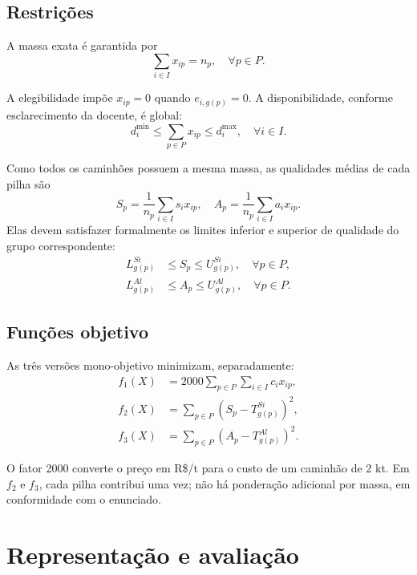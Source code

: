 \documentclass[10pt,twocolumn,a4paper]{article}
\begin{document}
\subsection{Restrições}

A massa exata é garantida por
\begin{equation}
\sum_{i \in I} x_{ip} = n_p, \quad \forall p \in P.
\end{equation}

A elegibilidade impõe $x_{ip} = 0$ quando $e_{i,g(p)} = 0$. A disponibilidade, conforme esclarecimento da docente, é global:
\begin{equation}
d_i^{\min} \le \sum_{p \in P} x_{ip} \le d_i^{\max}, \quad \forall i \in I.
\end{equation}

Como todos os caminhões possuem a mesma massa, as qualidades médias de cada pilha são
\begin{equation}
S_p = \frac{1}{n_p} \sum_{i \in I} s_i x_{ip}, \quad A_p = \frac{1}{n_p} \sum_{i \in I} a_i x_{ip}.
\end{equation}
Elas devem satisfazer formalmente os limites inferior e superior de qualidade do grupo correspondente:
\begin{align}
L_{g(p)}^{Si} &\le S_p \le U_{g(p)}^{Si}, \quad \forall p \in P, \\
L_{g(p)}^{Al} &\le A_p \le U_{g(p)}^{Al}, \quad \forall p \in P.
\end{align}

\subsection{Funções objetivo}

As três versões mono-objetivo minimizam, separadamente:
\begin{align}
f_1(X) &= 2000 \sum_{p \in P} \sum_{i \in I} c_i x_{ip}, \\
f_2(X) &= \sum_{p \in P} \left( S_p - T_{g(p)}^{Si} \right)^2, \\
f_3(X) &= \sum_{p \in P} \left( A_p - T_{g(p)}^{Al} \right)^2.
\end{align}

O fator 2000 converte o preço em R\$/t para o custo de um caminhão de 2 kt. Em $f_2$ e $f_3$, cada pilha contribui uma vez; não há ponderação adicional por massa, em conformidade com o enunciado.

\section{Representação e avaliação}
\end{document}
